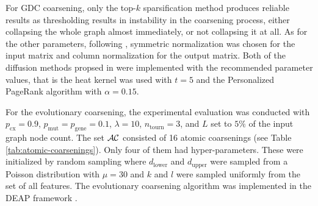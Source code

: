 For GDC coarsening, only the top-\( k \) sparsification method produces reliable results as thresholding results in instability in the coarsening process, either collapsing the whole graph almost immediately, or not collapsing it at all. As for the other parameters, following \cite{gasteiger_diffusion_2019}, symmetric normalization was chosen for the input matrix and column normalization for the output matrix. Both of the diffusion methods propsed in \cite{gasteiger_diffusion_2019} were implemented with the recommended parameter values, that is the heat kernel was used with \( t = 5 \) and the Personalized PageRank algorithm with \( \alpha = 0.15 \).

For the evolutionary coarsening, the experimental evaluation was conducted with \( p_\mathrm{cx} = 0.9 \), \( p_\mathrm{mut} = p_\mathrm{gene} = 0.1 \), \( \lambda = 10 \), \( n_\mathrm{tourn} = 3 \), and \( L \) set to \( 5\% \) of the input graph node count. The set \( \mathcal{AC} \) consisted of 16 atomic coarsenings (see Table \ref{tab:atomic-coarsenings}). Only four of them had hyper-parameters. These were initialized by random sampling where \( d_\mathrm{lower} \) and \( d_\mathrm{upper} \) were sampled from a Poisson distribution with \( \mu = 30 \) and \( k \) and \( l \) were sampled uniformly from the set of all features. The evolutionary coarsening algorithm was implemented in the DEAP framework \cite{fortin_deap_2012}.

